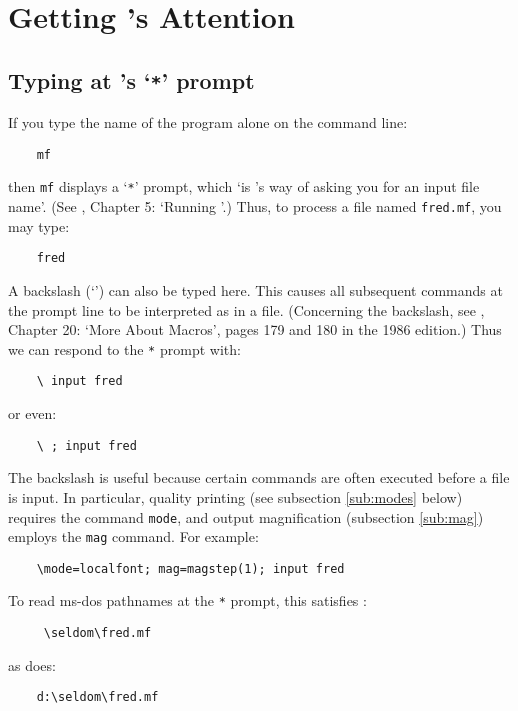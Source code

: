 \section{Getting \MF{}'s Attention}\label{sec:typing}


\subsection{Typing at \MF{}'s `{\tt **}' prompt}\label{sub:starstar}

If you type the name of the \MF{} program alone on the command line:
\begin{verbatim}
    mf
\end{verbatim}
then {\tt mf} displays a `{\tt **}' prompt,
which
`is \MF{}'s way of asking you for an input file name'.
(See \MFbook{}, Chapter 5: `Running \MF{}'.)
Thus, to process a \MF{} file named {\tt fred.mf}, you may type:
\begin{verbatim}
    fred
\end{verbatim}

A backslash (`\ttbsl') can also be typed here.
This causes all subsequent commands at the prompt line to be
interpreted as in a \MF{} file.
(Concerning the backslash, see \MFbook{}, Chapter 20:
`More About Macros', pages 179 and 180 in the 1986 edition.)
Thus we can respond to the {\tt **} prompt with:
\begin{verbatim}
    \ input fred
\end{verbatim}
or even:
\begin{verbatim}
    \ ; input fred
\end{verbatim}

The backslash is useful because
certain commands are often executed before a \MF{} file is input.
In particular, quality printing
(see subsection \ref{sub:modes} below)
requires the \MF{} command {\tt mode},
and output magnification
(subsection \ref{sub:mag})
employs the {\tt mag} command.
For example:
\begin{verbatim}
    \mode=localfont; mag=magstep(1); input fred
\end{verbatim}

To read {\sc ms-dos} pathnames at the {\tt **} prompt,
this satisfies \MF{}:
\begin{verbatim}
     \seldom\fred.mf
\end{verbatim}
as does:
\begin{verbatim}
    d:\seldom\fred.mf
\end{verbatim}


